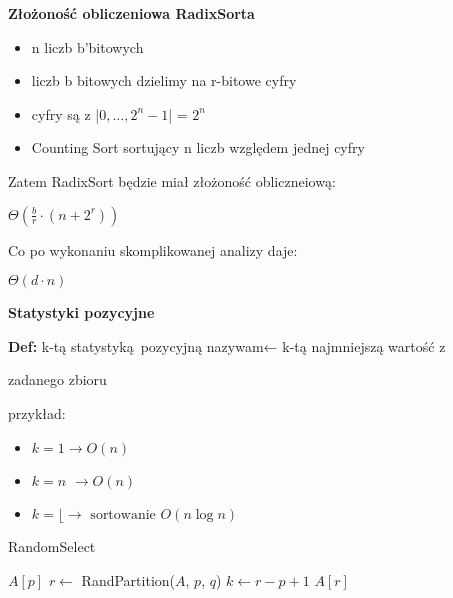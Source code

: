 \documentclass{article}
\begin{document}
    \textbf{Złożoność obliczeniowa RadixSorta} \par
    \begin{itemize}
        \item n liczb b'bitowych
        \item liczb b bitowych dzielimy na r-bitowe cyfry
        \item cyfry są z |{$0,...,2^n-1$}| = $2^n$ \par
        \item Counting Sort sortujący n liczb względem jednej cyfry
    \end{itemize} \par
    Zatem RadixSort będzie miał złożoność obliczneiową: \par
    $\Theta(\frac{b}{r} \cdot (n + 2^r))$ \par
    Co po wykonaniu skomplikowanej analizy daje: \par
    $\Theta(d \cdot n)$ \par

    \vspace{2\baselineskip}
    \textbf{Statystyki pozycyjne} \par
    \vspace{1\baselineskip} \par
    \textbf{Def: } k-tą statystyką pozycyjną nazywam← k-tą najmniejszą wartość z \par
    zadanego zbioru \par
    przykład: \par
    \begin{itemize}
        \item $k=1 \rightarrow O(n)$
        \item $k=n$ $\rightarrow O(n)$
        \item $k=\lfloor \rightarrow \text { sortowanie } O(n \log n)$
    \end{itemize}
    \vspace{1\baselineskip}
    \begin{algorithm}[H]
        \caption{RandomSelect}
        \label{alg:randomselect}
        \begin{algorithmic}[1]
                    \State \Return $A[p]$
                \EndIf
                \State $r \gets$ RandPartition($A$, $p$, $q$)
                \State $k \gets r - p + 1$
                    \State \Return $A[r]$
                    \State \Return {}
                \Else
                    \State \Return {}
                \EndIf         
            \EndProcedure
        \end{algorithmic}
    \end{algorithm}
    
\end{document}
